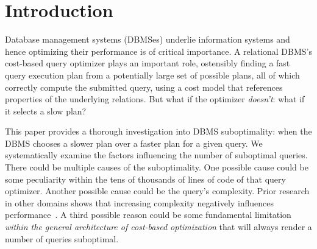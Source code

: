 \documentclass[prodmode,acmtods]{acmsmall}
\begin{document}
\terms{}
\keywords{}

\maketitle

\section{Introduction}\label{sec:intro}
Database management systems (DBMSes) underlie information systems and hence optimizing their performance is of
critical importance. A relational DBMS's cost-based query optimizer plays an
important role, ostensibly finding a fast query execution plan from a
potentially large set of possible plans, all of which correctly compute the
submitted query, using a cost model that references properties of the
underlying relations. But
what if the optimizer {\em doesn't}: what if it selects a slow plan?

This paper provides a thorough investigation into \hbox{DBMS}
suboptimality: when the \hbox{DBMS} chooses a slower plan over a faster
plan for a given query. We systematically examine the factors influencing
the number of suboptimal queries. There could be multiple causes of the
suboptimality. One possible cause could be some peculiarity within the tens
of thousands of lines of code of that query optimizer. Another possible
cause could be the query's complexity. Prior research in other domains shows
that increasing complexity negatively influences
performance~\cite{campbell88,moody98}. A third possible reason could be some
fundamental limitation {\em within the general architecture of cost-based
  optimization} that will always render a number of queries suboptimal.
\end{document}
